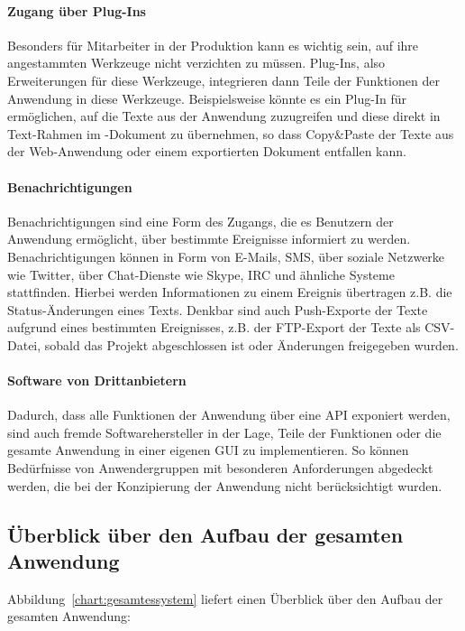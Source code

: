 \paragraph{Zugang über Plug-Ins} Besonders für Mitarbeiter in der Produktion kann es wichtig sein, auf ihre angestammten Werkzeuge nicht verzichten zu müssen. Plug-Ins, also Erweiterungen für diese Werkzeuge, integrieren dann Teile der Funktionen der Anwendung in diese Werkzeuge. Beispielsweise könnte es ein Plug-In für  ermöglichen, auf die Texte aus der Anwendung zuzugreifen und diese direkt in Text-Rahmen im -Dokument zu übernehmen, so dass Copy\&Paste der Texte aus der Web-Anwendung oder einem exportierten Dokument entfallen kann.

\paragraph{Benachrichtigungen} Benachrichtigungen sind eine Form des Zugangs, die es Benutzern der Anwendung ermöglicht, über bestimmte Ereignisse informiert zu werden. Benachrichtigungen können in Form von E-Mails, SMS, über soziale Netzwerke wie Twitter, über Chat-Dienste wie Skype, IRC und ähnliche Systeme stattfinden. Hierbei werden Informationen zu einem Ereignis übertragen z.B. die Status-Änderungen eines Texts. Denkbar sind auch Push-Exporte der Texte aufgrund eines bestimmten Ereignisses, z.B. der FTP-Export der Texte als CSV-Datei, sobald das Projekt abgeschlossen ist oder Änderungen freigegeben wurden.

\paragraph{Software von Drittanbietern} Dadurch, dass alle Funktionen der Anwendung über eine API exponiert werden, sind auch fremde Softwarehersteller in der Lage, Teile der Funktionen oder die gesamte Anwendung in einer eigenen GUI zu implementieren. So können Bedürfnisse von Anwendergruppen mit besonderen Anforderungen abgedeckt werden, die bei der Konzipierung der Anwendung nicht berücksichtigt wurden.

\pagebreak

\subsection{Überblick über den Aufbau der gesamten Anwendung}

Abbildung~\ref{chart:gesamtessystem} liefert einen Überblick über den Aufbau der gesamten Anwendung:


